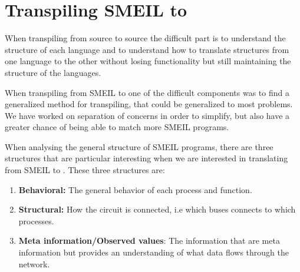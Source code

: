 





\section{Transpiling SMEIL to \cspm{}} \label{sec:transpiling}
When transpiling from source to source the difficult part is to understand the structure of each language and to understand how to translate structures from one language to the other without losing functionality but still maintaining the structure of the languages.

When transpiling from SMEIL to \cspm{} one of the difficult components was to find a generalized method for transpiling, that could be generalized to most problems. We have worked on separation of concerns in order to simplify, but also have a greater chance of being able to match more SMEIL programs.







When analysing the general structure of SMEIL programs, there are three structures that are particular interesting when we are interested in translating from SMEIL to \cspm{}. These three structures are:
\begin{enumerate}
    \item \textbf{Behavioral:} The general behavior of each process and function.
    \item \textbf{Structural:} How the circuit is connected, i.e which buses connects to which processes.
    \item \textbf{Meta information/Observed values}: The information that are meta information but provides an understanding of what data flows through the network.
\end{enumerate}


